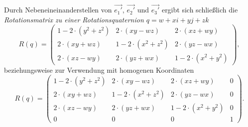 Durch Nebeneineinanderstellen von $\vec{e_1'}$, $\vec{e_2'}$ und $\vec{e_3'}$ ergibt sich schließlich die \emph{Rotationsmatrix zu einer Rotationsquaternion $q = w + xi + yj + zk$}
\begin{equation}
 R(q) =
 \begin{pmatrix}
  1 - 2 \cdot ( y^2 + z^2 ) & 2 \cdot ( xy - wz ) & 2 \cdot ( xz + wy ) \\
  2 \cdot ( xy + wz ) & 1 - 2 \cdot ( x^2 + z^2 ) & 2 \cdot ( yz - wx ) \\
  2 \cdot ( xz - wy ) & 2 \cdot ( yz + wx ) & 1 - 2 \cdot ( x^2 + y^2 )
 \end{pmatrix},
\end{equation}
beziehungsweise zur Verwendung mit homogenen Koordinaten
\begin{equation}
 R(q) =
 \begin{pmatrix}
  1 - 2 \cdot ( y^2 + z^2 ) & 2 \cdot ( xy - wz ) & 2 \cdot ( xz + wy ) & 0 \\
  2 \cdot ( xy + wz ) & 1 - 2 \cdot ( x^2 + z^2 ) & 2 \cdot ( yz - wx ) & 0 \\
  2 \cdot ( xz - wy ) & 2 \cdot ( yz + wx ) & 1 - 2 \cdot ( x^2 + y^2 ) & 0 \\
  0 & 0 & 0 & 1
 \end{pmatrix}.
\end{equation}

